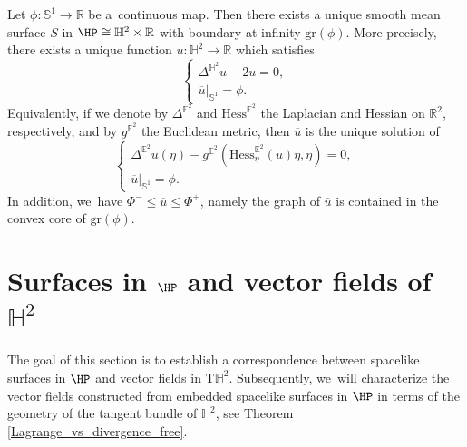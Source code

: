 \begin{prop}\label{BF_platau_HP}
Let $\phi:\mathbb{S}^1\to\mathbb{R}$ be a~continuous map. Then there exists a unique smooth mean surface $S$ in $\HP\cong\mathbb{H}^2\times\mathbb{R}$ with boundary at infinity $\mathrm{gr}(\phi)$. More precisely, there exists a unique function $u:\mathbb{H}^2\to\mathbb{R}$ which satisfies
\begin{equation}\label{platau_HP}
\begin{cases}
\Delta^{\mathbb{H}^2} u-2u=0, \\
\overline{u}|_{\mathbb{S}^1}=\phi.
\end{cases}\end{equation}
Equivalently, if we denote by \(\Delta^{\mathbb{E}^2}\) and \(\mathrm{Hess}^{\mathbb{E}^2}\) the Laplacian and Hessian on \(\mathbb{R}^2\), respectively, and by \(g^{\mathbb{E}^2}\) the Euclidean metric, then \(\overline{u}\) is the unique solution of \begin{equation}\label{platau_HPE}
\begin{cases}
\Delta^{\mathbb{E}^2}\overline{u}(\eta)-g^{\mathbb{E}^2}(\mathrm{Hess}_{\eta}^{\mathbb{E}^2}(u)\eta,\eta)=0, \\
\overline{u}|_{\mathbb{S}^1}=\phi.
\end{cases}\end{equation}
In addition, we~have $\Phi^-\leq\overline{u}\leq \Phi^+$, namely the graph of $\overline{u}$ is contained in the convex core of $\mathrm{gr}(\phi)$.
\end{prop}

\section{Surfaces in \texorpdfstring{$\HP$}{HP} and vector fields of \texorpdfstring{$\mathbb{H}^2$}{H2}}
\label{sec4_correpondance}
The goal of this section is to establish a correspondence between spacelike surfaces in $\HP$ and vector fields in $\mathrm{T}\mathbb{H}^2$. Subsequently, we~will characterize the vector fields constructed from embedded spacelike surfaces in $\HP$ in terms of the geometry of the tangent bundle of $\mathbb{H}^2$, see Theorem \ref{Lagrange_vs_divergence_free}.

